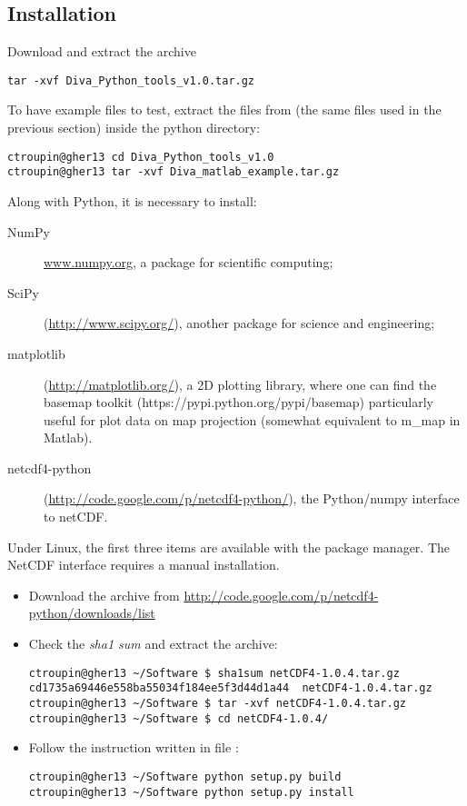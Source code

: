 \subsection{Installation}

Download and extract the archive 
\begin{lstlisting}[style=Bash]
 tar -xvf Diva_Python_tools_v1.0.tar.gz
\end{lstlisting}

To have example files to test, extract the files from  (the same files used in the previous section) inside the python directory:
\begin{lstlisting}[style=Bash]
ctroupin@gher13 cd Diva_Python_tools_v1.0
ctroupin@gher13 tar -xvf Diva_matlab_example.tar.gz
\end{lstlisting}

Along with Python, it is necessary to install:
\begin{description}
\item[NumPy] \url{www.numpy.org}, a package for scientific computing;
\item[SciPy] (\url{http://www.scipy.org/}), another package for science and engineering;
\item[matplotlib] (\url{http://matplotlib.org/}), a 2D plotting library, where one can find the basemap toolkit (https://pypi.python.org/pypi/basemap) particularly useful for plot data on map projection (somewhat equivalent to m\_map in Matlab).
\item[netcdf4-python] (\url{http://code.google.com/p/netcdf4-python/}), the Python/numpy interface to netCDF.
\end{description}

Under Linux, the first three items are available with the package manager. The NetCDF interface requires a manual installation.

\begin{itemize}
\item Download the archive from \url{http://code.google.com/p/netcdf4-python/downloads/list}
\item Check the \textit{sha1 sum} and extract the archive:
\begin{lstlisting}[style=Bash]
ctroupin@gher13 ~/Software $ sha1sum netCDF4-1.0.4.tar.gz 
cd1735a69446e558ba55034f184ee5f3d44d1a44  netCDF4-1.0.4.tar.gz
ctroupin@gher13 ~/Software $ tar -xvf netCDF4-1.0.4.tar.gz 
ctroupin@gher13 ~/Software $ cd netCDF4-1.0.4/
\end{lstlisting}
\item Follow the instruction written in file :
\begin{lstlisting}[style=Bash]
ctroupin@gher13 ~/Software python setup.py build
ctroupin@gher13 ~/Software python setup.py install
\end{lstlisting}
\end{itemize}

